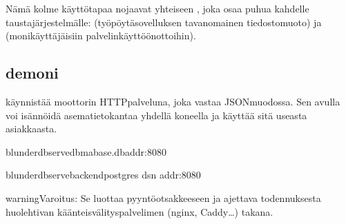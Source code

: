 \documentclass[letterpaper,10pt,finnish]{sphinxmanual}
\begin{document}
\sphinxAtStartPar
Nämä kolme käyttötapaa nojaavat yhteiseen , joka osaa puhua kahdelle taustajärjestelmälle:  (työpöytäsovelluksen tavanomainen \sphinxhyphen{}tiedostomuoto) ja  (monikäyttäjäisiin palvelinkäyttöönottoihin).


\subsection{\sphinxhyphen{}demoni}
\label{\detokenize{mode_headless:le-demon-serve}}\label{\detokenize{mode_headless:headless-serve}}
\sphinxAtStartPar
{} käynnistää moottorin HTTP\sphinxhyphen{}palveluna, joka vastaa JSON\sphinxhyphen{}muodossa. Sen avulla voi isännöidä asematietokantaa yhdellä koneella ja käyttää sitä useasta asiakkaasta.

\begin{sphinxVerbatim}[commandchars=\\\{\}]
blunderdbserve\PYGZhy{}\PYGZhy{}dbma\PYGZus{}base.db\PYGZhy{}\PYGZhy{}addr:8080

blunderdbserve\PYGZhy{}\PYGZhy{}backendpostgres
\PYGZhy{}\PYGZhy{}dsn
\PYGZhy{}\PYGZhy{}addr:8080
\end{sphinxVerbatim}

\begin{sphinxadmonition}{warning}{Varoitus:}
\sphinxAtStartPar
{} Se luottaa \sphinxhyphen{}pyyntöotsakkeeseen ja  ajettava todennuksesta huolehtivan käänteisvälityspalvelimen (nginx, Caddy…) takana. 
\end{sphinxadmonition}

\sphinxAtStartPar
{}
\end{document}
